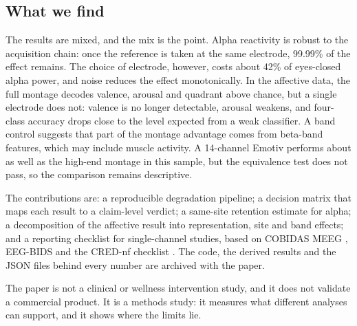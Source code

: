\subsection*{What we find}
The results are mixed, and the mix is the point. Alpha reactivity is robust to the
acquisition chain: once the reference is taken at the same electrode, 99.99\% of the
effect remains. The choice of electrode, however, costs about 42\% of eyes-closed alpha
power, and noise reduces the effect monotonically. In the affective data, the full
montage decodes valence, arousal and quadrant above chance, but a single electrode does
not: valence is no longer detectable, arousal weakens, and four-class accuracy drops
close to the level expected from a weak classifier. A band control suggests that part of
the montage advantage comes from beta-band features, which may include muscle activity.
A 14-channel Emotiv performs about as well as the high-end montage in this sample, but
the equivalence test does not pass, so the comparison remains descriptive.

The contributions are: a reproducible degradation pipeline; a decision matrix that maps
each result to a claim-level verdict; a same-site retention estimate for alpha; a
decomposition of the affective result into representation, site and band effects; and a
reporting checklist for single-channel studies, based on COBIDAS MEEG
\citep{pernet2020cobidas}, EEG-BIDS \citep{pernet2019bids} and the CRED-nf checklist
\citep{ros2020crednf}. The code, the derived results and the JSON files behind every
number are archived with the paper.

The paper is not a clinical or wellness intervention study, and it does not validate a
commercial product. It is a methods study: it measures what different analyses can
support, and it shows where the limits lie.
